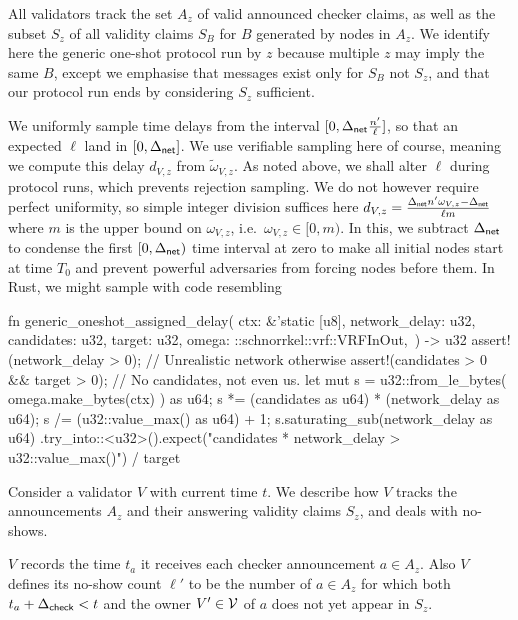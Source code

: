 All validators track the set $A_z$ of valid announced checker claims, as well as the subset $S_z$ of all validity claims $S_B$ for $B$ generated by nodes in $A_z$.  We identify here the generic one-shot protocol run by $z$ because multiple $z$ may imply the same $B$, except we emphasise that messages exist only for $S_B$ not $S_z$, and that our protocol run ends by considering $S_z$ sufficient.  

We uniformly sample time delays from the interval $[0,\Delta_{\mathsf{net}} {n' \over \ell}]$, so that an expected $\ell$ land in $[0,\Delta_{\mathsf{net}}]$.  We use verifiable sampling here of course, meaning we compute this delay $d_{V,z}$ from $\tilde{\omega}_{V,z}$.  
%
As noted above, we shall alter $\ell$ during protocol runs, which prevents rejection sampling.  We do not however require perfect uniformity, so simple integer division suffices here $d_{V,z} = {\Delta_{\mathsf{net}} n' \omega_{V,z} - \Delta_{\mathsf{net}} \over \ell m}$ where $m$ is the upper bound on $\omega_{V,z}$, i.e.\ $\omega_{V,z} \in [0,m)$.  
%
In this, we subtract $\Delta_{\mathsf{net}}$ to condense the first $[0,\Delta_{\mathsf{net}})$ time interval at zero to make all initial nodes start at time $T_0$ and prevent powerful adversaries from forcing nodes before them. 
%
In Rust, we might sample with code resembling
\begin{code}
fn generic_oneshot_assigned_delay(
    ctx: &'static [u8],
    network_delay: u32, 
    candidates: u32,
    target: u32,
    omega: ::schnorrkel::vrf::VRFInOut,\
) -> u32 {
    assert!(network_delay > 0); // Unrealistic network otherwise
    assert!(candidates > 0 && target > 0); // No candidates, not even us.
    let mut s = u32::from_le_bytes( omega.make_bytes(ctx) ) as u64;
    s *= (candidates as u64) * (network_delay as u64);
    s /= (u32::value_max() as u64) + 1;
    s.saturating_sub(network_delay as u64)
    .try_into::<u32>().expect("candidates * network_delay > u32::value_max()")
    / target
}
\end{code}

Consider a validator $V$ with current time $t$.  We describe how $V$ tracks the announcements $A_z$ and their answering validity claims $S_z$, and deals with no-shows.

$V$ records the time $t_a$ it receives each checker announcement $a \in A_z$.  Also $V$ defines its no-show count $\ell'$ to be the number of $a \in A_z$ for which both $t_a + \Delta_{\mathsf{check}} < t$ and the owner $V'\in \mathcal{V}$ of $a$ does not yet appear in $S_z$.

